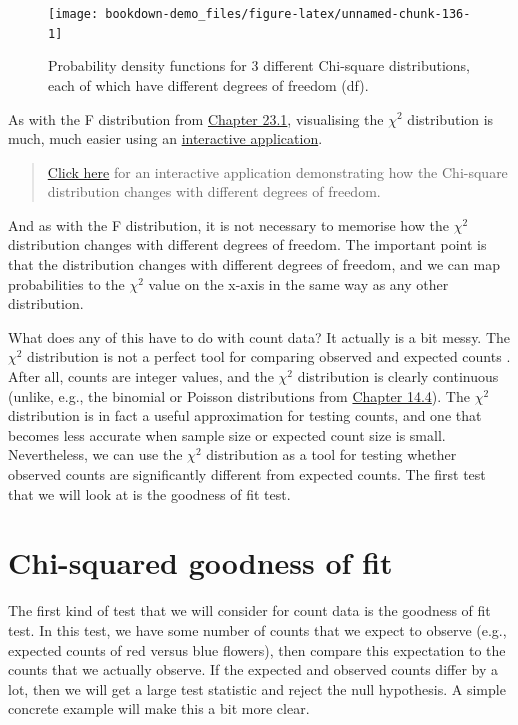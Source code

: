 \documentclass[
]{scrbook}
\begin{document}
\begin{figure}
\texttt{[image: bookdown-demo\_files/figure-latex/unnamed-chunk-136-1]} \caption{Probability density functions for 3 different Chi-square distributions, each of which have different degrees of freedom (df).}\label{fig:unnamed-chunk-136}
\end{figure}

As with the F distribution from \protect\hyperlink{the-f-distribution}{Chapter 23.1}, visualising the \(\chi^{2}\) distribution is much, much easier using an \href{https://bradduthie.shinyapps.io/chi-square/}{interactive application}.

\begin{quote}
\href{https://bradduthie.shinyapps.io/chi-square/}{Click here} for an interactive application demonstrating how the Chi-square distribution changes with different degrees of freedom.
\end{quote}

And as with the F distribution, it is not necessary to memorise how the \(\chi^{2}\) distribution changes with different degrees of freedom.
The important point is that the distribution changes with different degrees of freedom, and we can map probabilities to the \(\chi^{2}\) value on the x-axis in the same way as any other distribution.

What does any of this have to do with count data? It actually is a bit messy.
The \(\chi^{2}\) distribution is not a perfect tool for comparing observed and expected counts \citep{Sokal1995}.
After all, counts are integer values, and the \(\chi^{2}\) distribution is clearly continuous (unlike, e.g., the binomial or Poisson distributions from \protect\hyperlink{ux5cux23probability-distributions}{Chapter 14.4}).
The \(\chi^{2}\) distribution is in fact a useful approximation for testing counts, and one that becomes less accurate when sample size \citep{Slakter1968} or expected count size \citep{Tate1973} is small.
Nevertheless, we can use the \(\chi^{2}\) distribution as a tool for testing whether observed counts are significantly different from expected counts.
The first test that we will look at is the goodness of fit test.

\hypertarget{chi-squared-goodness-of-fit}{%
\section{Chi-squared goodness of fit}\label{chi-squared-goodness-of-fit}}

The first kind of test that we will consider for count data is the goodness of fit test.
In this test, we have some number of counts that we expect to observe (e.g., expected counts of red versus blue flowers), then compare this expectation to the counts that we actually observe.
If the expected and observed counts differ by a lot, then we will get a large test statistic and reject the null hypothesis.
A simple concrete example will make this a bit more clear.
\end{document}
